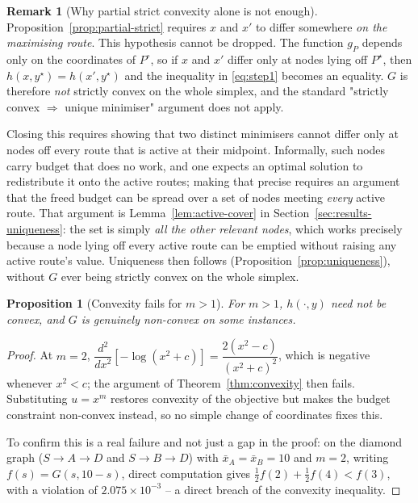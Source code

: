 \documentclass[11pt,a4paper]{article}
\theoremstyle{plain}
\newtheorem{proposition}[theorem]{Proposition}
\theoremstyle{definition}
\newtheorem{remark}[theorem]{Remark}
\newcommand{\XA}{\bar{x}_A}
\newcommand{\XB}{\bar{x}_B}
\begin{document}
\begin{remark}[Why partial strict convexity alone is not enough]
\label{rem:uniqueness-open}
Proposition~\ref{prop:partial-strict} requires $x$ and $x'$ to differ
somewhere \emph{on the maximising route}. This hypothesis cannot be
dropped. The function $g_P$ depends only on the coordinates of $P^{\circ}$,
so if $x$ and $x'$ differ only at nodes lying off $P^{\star}$, then
$h(x,y^{\star})=h(x',y^{\star})$ and the inequality in \eqref{eq:step1}
becomes an equality. $G$ is therefore \emph{not} strictly convex on the
whole simplex, and the standard "strictly convex $\Rightarrow$ unique
minimiser" argument does not apply.

Closing this requires showing that two distinct minimisers cannot differ
only at nodes off every route that is active at their midpoint.
Informally, such nodes carry budget that does no work, and one expects an
optimal solution to redistribute it onto the active routes; making that
precise requires an argument that the freed budget can be spread over a
set of nodes meeting \emph{every} active route. That argument is
Lemma~\ref{lem:active-cover} in
Section~\ref{sec:results-uniqueness}: the set is simply \emph{all the
other relevant nodes}, which works precisely because a node lying off
every active route can be emptied without raising any active route's
value. Uniqueness then follows
(Proposition~\ref{prop:uniqueness}), without $G$ ever being strictly
convex on the whole simplex.
\end{remark}

\begin{proposition}[Convexity fails for $m>1$]
\label{prop:m-gt-1}
For $m>1$, $h(\cdot,y)$ need not be convex, and $G$ is genuinely
non-convex on some instances.
\end{proposition}
\begin{proof}
At $m=2$, $\dfrac{d^2}{dx^2}[-\log(x^2+c)]=\dfrac{2(x^2-c)}{(x^2+c)^2}$,
which is negative whenever $x^2<c$; the argument of
Theorem~\ref{thm:convexity} then fails. Substituting $u=x^m$ restores
convexity of the objective but makes the budget constraint non-convex
instead, so no simple change of coordinates fixes this.

To confirm this is a real failure and not just a gap in the proof: on the
diamond graph ($S\to A\to D$ and $S\to B\to D$) with $\XA=\XB=10$ and
$m=2$, writing $f(s)=G(s,10-s)$, direct computation gives
$\tfrac12f(2)+\tfrac12f(4) < f(3)$, with a violation of
$2.075\times10^{-3}$ -- a direct breach of the convexity inequality.
\end{proof}
\end{document}
